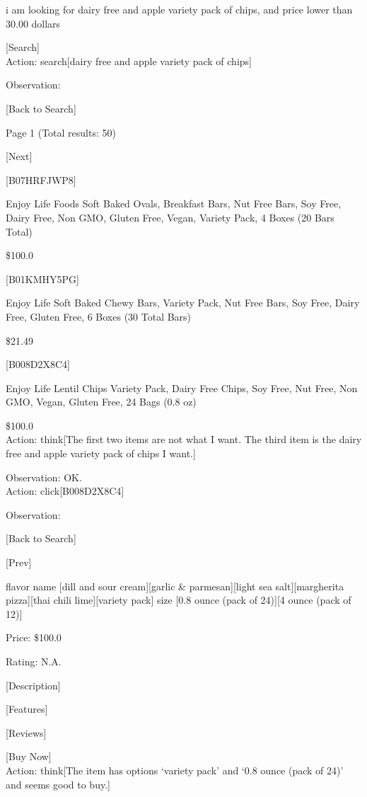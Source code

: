 {i am looking for dairy free and apple variety pack of chips, and price lower than 30.00 dollars

[Search]
\\

Action: search[dairy free and apple variety pack of chips]

Observation:

[Back to Search]

Page 1 (Total results: 50)

[Next]

[B07HRFJWP8]

Enjoy Life Foods Soft Baked Ovals, Breakfast Bars, Nut Free Bars, Soy Free, Dairy Free, Non GMO, Gluten Free, Vegan, Variety Pack, 4 Boxes (20 Bars Total)

\$100.0

[B01KMHY5PG]

Enjoy Life Soft Baked Chewy Bars, Variety Pack, Nut Free Bars, Soy Free, Dairy Free, Gluten Free, 6 Boxes (30 Total Bars)

\$21.49

[B008D2X8C4]

Enjoy Life Lentil Chips Variety Pack, Dairy Free Chips, Soy Free, Nut Free, Non GMO, Vegan, Gluten Free, 24 Bags (0.8 oz)

\$100.0
\\

Action: think[The first two items are not what I want. The third item is the dairy free and apple variety pack of chips I want.]

Observation: OK.
\\

Action: click[B008D2X8C4]

Observation:

[Back to Search]

[Prev]

flavor name [dill and sour cream][garlic \& parmesan][light sea salt][margherita pizza][thai chili lime][variety pack]
size [0.8 ounce (pack of 24)][4 ounce (pack of 12)]

Price: \$100.0

Rating: N.A.

[Description]

[Features]

[Reviews]

[Buy Now]
\\

Action: think[The item has options `variety pack' and `0.8 ounce (pack of 24)' and seems good to buy.]

}
